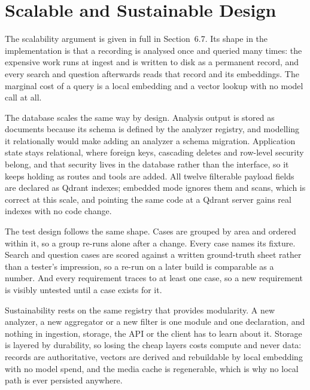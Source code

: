 \documentclass[11pt,a4paper]{article}
\begin{document}
\section{Scalable and Sustainable Design}

The scalability argument is given in full in Section~6.7. Its shape in the
implementation is that a recording is analysed once and queried many times: the
expensive work runs at ingest and is written to disk as a permanent record, and
every search and question afterwards reads that record and its embeddings. The
marginal cost of a query is a local embedding and a vector lookup with no model
call at all.

The database scales the same way by design. Analysis output is stored as
documents because its schema is defined by the analyzer registry, and modelling
it relationally would make adding an analyzer a schema migration. Application
state stays relational, where foreign keys, cascading deletes and row-level
security belong, and that security lives in the database rather than the
interface, so it keeps holding as routes and tools are added. All twelve
filterable payload fields are declared as Qdrant indexes; embedded mode ignores
them and scans, which is correct at this scale, and pointing the same code at a
Qdrant server gains real indexes with no code change.

The test design follows the same shape. Cases are grouped by area and ordered
within it, so a group re-runs alone after a change. Every case names its
fixture. Search and question cases are scored against a written ground-truth
sheet rather than a tester's impression, so a re-run on a later build is
comparable as a number. And every requirement traces to at least one case, so a
new requirement is visibly untested until a case exists for it.

Sustainability rests on the same registry that provides modularity. A new
analyzer, a new aggregator or a new filter is one module and one declaration,
and nothing in ingestion, storage, the API or the client has to learn about it.
Storage is layered by durability, so losing the cheap layers costs compute and
never data: records are authoritative, vectors are derived and rebuildable by
local embedding with no model spend, and the media cache is regenerable, which
is why no local path is ever persisted anywhere.

\end{document}
